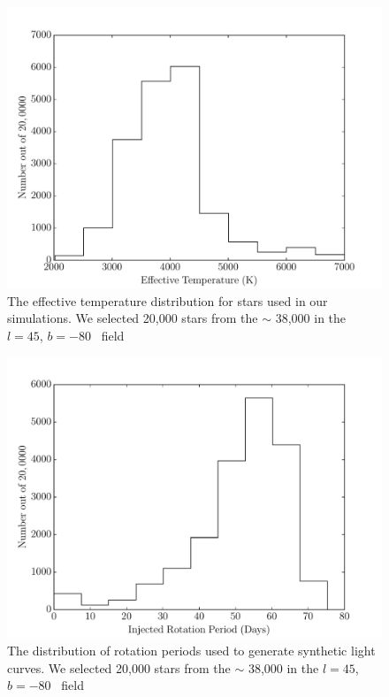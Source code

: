 \begin{figure}
\begin{center}
\includegraphics[width=6in, clip=true]{figures/trilegal_teff_hist-80.pdf}
\caption[The effective temperature distribution for stars used in \LSST\
simulations]
{The effective temperature distribution for stars used in our simulations.
We selected 20,000 stars from the $\sim$ 38,000 in the $l=45$, $b=-80$
\trilegal\ field}
\label{fig:trilegal_teff_hist}
\end{center}
\end{figure}

\begin{figure}
\begin{center}
\includegraphics[width=6in, clip=true]{figures/trilegal_period_hist-80.pdf}
\caption[The period distribution for stars used in \LSST\
simulations]
{The distribution of rotation periods used to generate synthetic light curves.
We selected 20,000 stars from the $\sim$ 38,000 in the $l=45$, $b=-80$
\trilegal\ field}
\label{fig:trilegal_period_hist}
\end{center}
\end{figure}

